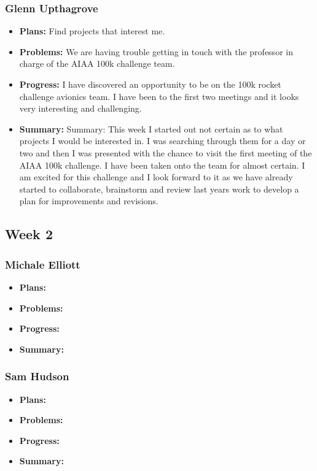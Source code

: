 \documentclass[onecolumn, draftclsnofoot,10pt, compsoc]{IEEEtran}
\begin{document}
\subsubsection{Glenn Upthagrove}
\begin {itemize}
 \item \textbf{Plans: }Find projects that interest me. 
 \item \textbf{Problems: }We are having trouble getting in touch with the professor in charge of the AIAA 100k challenge team. 
 \item \textbf{Progress: }I have discovered an opportunity to be on the 100k rocket challenge avionics team. I have been to the first two meetings and it looks very interesting and challenging.  
 \item \textbf{Summary: }Summary: This week I started out not certain as to what projects I would be interested in. I was searching through them for a day or two and then I was presented with the chance to visit the first meeting of the AIAA 100k challenge. I have been taken onto the team for almost certain. I am excited for this challenge and I look forward to it as we have already started to collaborate, brainstorm and review last years work to develop a plan for improvements and revisions.  
\end {itemize}
\subsection {Week 2}
\subsubsection{Michale Elliott}
\begin {itemize}
 \item \textbf{Plans: }
 \item \textbf{Problems: }
 \item \textbf{Progress: }
 \item \textbf{Summary: }
\end {itemize}
\subsubsection{Sam Hudson}
\begin {itemize}
 \item \textbf{Plans: }
 \item \textbf{Problems: }
 \item \textbf{Progress: }
 \item \textbf{Summary: }
\end {itemize}
\end{document}
